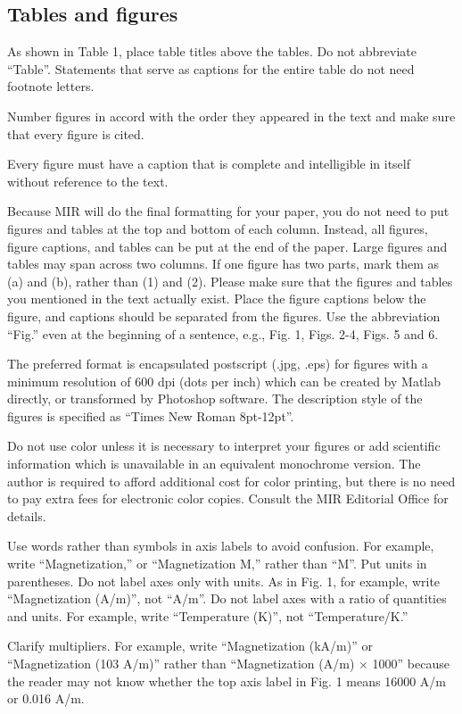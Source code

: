 \documentclass[journal,a4paper]{IEEEtran}
\begin{document}
\subsection{Tables and figures}

As shown in Table 1, place table titles above the tables. Do not abbreviate ``Table''. Statements that serve as captions for the entire table do not need footnote letters.

Number figures in accord with the order they appeared in the text and make sure that every figure is cited.

Every figure must have a caption that is complete and intelligible in itself without reference to the text.

Because MIR will do the final formatting for your paper, you do not need to put figures and tables at the top and bottom of each column. Instead, all figures, figure captions, and tables can be put at the end of the paper. Large figures and tables may span across two columns. If one figure has two parts, mark them as (a) and (b), rather than (1) and (2). Please make sure that the figures and tables you mentioned in the text actually exist. Place the figure captions below the figure, and captions should be separated from the figures. Use the abbreviation ``Fig.'' even at the beginning of a sentence, e.g., Fig. 1, Figs. 2-4, Figs. 5 and 6.

The preferred format is encapsulated postscript (.jpg, .eps) for figures with a minimum resolution of 600 dpi (dots per inch) which can be created by Matlab directly, or transformed by Photoshop software. The description style of the figures is specified as ``Times New Roman 8pt-12pt''.

Do not use color unless it is necessary to interpret your figures or add scientific information which is unavailable in an equivalent monochrome version. The author is required to afford additional cost for color printing, but there is no need to pay extra fees for electronic color copies. Consult the MIR Editorial Office for details.

Use words rather than symbols in axis labels to avoid confusion. For example, write ``Magnetization,'' or ``Magnetization M,'' rather than ``M''. Put units in parentheses. Do not label axes only with units. As in Fig. 1, for example, write ``Magnetization (A/m)'', not ``A/m''. Do not label axes with a ratio of quantities and units. For example, write ``Temperature (K)'', not ``Temperature/K.''

Clarify multipliers. For example, write ``Magnetization (kA/m)'' or ``Magnetization (103 A/m)'' rather than ``Magnetization (A/m) $\times$ 1000'' because the reader may not know whether the top axis label in Fig. 1 means 16000 A/m or 0.016 A/m.
\end{document}
